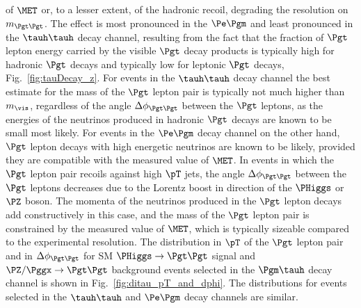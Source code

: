 of $\MET$ or, to a lesser extent, of the hadronic recoil,
degrading the resolution on $m_{\Pgt\Pgt}$.
The effect is most pronounced in the $\Pe\Pgm$ and least pronounced in the $\tauh\tauh$ decay channel,
resulting from the fact that the fraction of $\Pgt$ lepton energy carried by the visible $\Pgt$ decay products is typically high for hadronic $\Pgt$ decays and typically low for leptonic $\Pgt$ decays,
\cf Fig.~\ref{fig:tauDecay_z}.
For events in the $\tauh\tauh$ decay channel the best estimate for the mass of the $\Pgt$ lepton pair is typically not much higher than $m_{\vis}$,
regardless of the angle $\Delta\phi_{\Pgt\Pgt}$ between the $\Pgt$ leptons,
as the energies of the neutrinos produced in hadronic $\Pgt$ decays are known to be small most likely.
For events in the $\Pe\Pgm$ decay channel on the other hand,
$\Pgt$ lepton decays with high energetic neutrinos are known to be likely,
provided they are compatible with the measured value of $\MET$.
In events in which the $\Pgt$ lepton pair recoils against high $\pT$ jets,
the angle $\Delta\phi_{\Pgt\Pgt}$ between the $\Pgt$ leptons decreases due to the Lorentz boost in direction of the $\PHiggs$ or $\PZ$ boson.
The momenta of the neutrinos produced in the $\Pgt$ lepton decays add constructively in this case,
and the mass of the $\Pgt$ lepton pair is constrained by the measured value of $\MET$,
which is typically sizeable compared to the experimental resolution.
The distribution in $\pT$ of the $\Pgt$ lepton pair and in
$\Delta\phi_{\Pgt\Pgt}$ for SM $\PHiggs \to \Pgt\Pgt$ signal and
$\PZ/\Pggx \to \Pgt\Pgt$ background events selected in the $\Pgm\tauh$ decay
channel is shown in Fig.~\ref{fig:ditau_pT_and_dphi}.
The distributions for events selected in the $\tauh\tauh$ and $\Pe\Pgm$ decay channels are similar.

